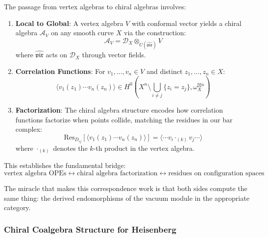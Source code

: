 \begin{example}\label{ex:vertex-to-chiral}
The passage from vertex algebras to chiral algebras involves:
\begin{enumerate}
\item \textbf{Local to Global}: A vertex algebra $V$ with conformal vector yields a chiral 
algebra $\mathcal{A}_V$ on any smooth curve $X$ via the construction:
$$\mathcal{A}_V = \mathcal{D}_X \otimes_{U(\hat{\mathfrak{vir}})} V$$
where $\hat{\mathfrak{vir}}$ acts on $\mathcal{D}_X$ through vector fields.

\item \textbf{Correlation Functions}: For $v_1, \ldots, v_n \in V$ and distinct $z_1, \ldots, z_n \in X$:
$$\langle v_1(z_1) \cdots v_n(z_n) \rangle \in H^0(X^n \setminus \bigcup_{i \neq j}\{z_i = z_j\}, \omega_X^{\boxtimes n})$$

\item \textbf{Factorization}: The chiral algebra structure encodes how correlation functions 
factorize when points collide, matching the residues in our bar complex:
$$\text{Res}_{D_{ij}}[\langle v_1(z_1) \cdots v_n(z_n) \rangle] = \langle \cdots v_i \cdot_{(k)} v_j \cdots \rangle$$
where $\cdot_{(k)}$ denotes the $k$-th product in the vertex algebra.
\end{enumerate}

This establishes the fundamental bridge: 
$$\text{vertex algebra OPEs} \leftrightarrow \text{chiral algebra factorization} \leftrightarrow \text{residues on configuration spaces}$$
\end{example}

\begin{remark}
The miracle that makes this correspondence work is that both sides compute the same thing: the derived endomorphisms of the vacuum module in the appropriate category.
\end{remark}

\subsubsection{Chiral Coalgebra Structure for Heisenberg}

